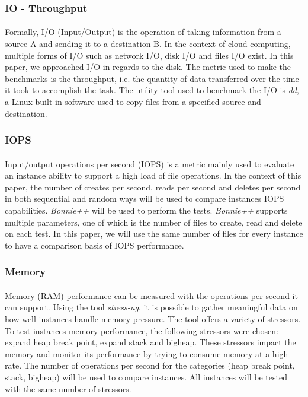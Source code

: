 \documentclass[11pt]{article}
\begin{document}
		\subsubsection{IO - Throughput}
			\paragraph{} Formally, I/O (Input/Output) is the operation of taking information from
			a source A and sending it to a destination B. In the context of cloud
			computing, multiple forms of I/O such as network I/O, disk I/O and files
			I/O exist. In this paper, we approached I/O in regards to the disk. The
			metric used to make the benchmarks is the throughput, i.e. the
			quantity of data transferred over the time it took to accomplish the
			task. The utility tool used to benchmark the I/O is \emph{dd}, a Linux built-in
			software used to copy files from a specified source and destination. 
		\subsubsection{IOPS}
			\paragraph{} Input/output operations per second (IOPS) is a metric mainly used to
			evaluate an instance ability to support a high load of file operations.
			In the context of this paper, the number of creates per second, reads per
			second and deletes per second in both sequential and random ways will be
			used to compare instances IOPS capabilities. \emph{Bonnie++} will be used to
			perform the tests. \emph{Bonnie++} supports multiple parameters, one of which
			is the number of files to create, read and delete on each test. In this
			paper, we will use the same number of files for every instance to
			have a comparison basis of IOPS performance. \cite{4}
		\subsubsection{Memory}
			\paragraph{} Memory (RAM) performance can be measured with the operations per
			second it can support. Using the tool \emph{stress-ng}, it is possible to gather
			meaningful data on how well instances handle memory pressure. The tool
			offers a variety of stressors. To test instances memory performance, the
			following stressors were chosen: expand heap break point, expand stack
			and bigheap. These stressors impact the memory and monitor its
			performance by trying to consume memory at a high rate. The number of
			operations per second for the categories (heap break point, stack,
			bigheap) will be used to compare instances. All instances will be tested
			with the same number of stressors. \cite{5}
\end{document}
